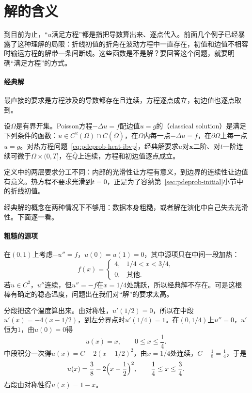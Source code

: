 \section{解的含义}
\label{sec:pdeprob-solutions}

到目前为止，“$u$满足方程”都是指把导数算出来、逐点代入。前面几个例子已经暴露了这种理解的局限：折线初值的折角在波动方程中一直存在，初值和边值不相容时输运方程的解带一条间断线。这些函数是不是解？要回答这个问题，就要明确“满足方程”的方式。

\paragraph{经典解}
最直接的要求是方程涉及的导数都存在且连续，方程逐点成立，初边值也逐点取到。

\begin{definition}[经典解]
\label{def:pdeprob-classical}
设$\Omega$是有界开集。Poisson方程$-\Delta u=f$配边值$u=g$的（classical solution）是满足下列条件的函数：$u\in C^{2}(\Omega)\cap C(\overline{\Omega})$，在$\Omega$内每一点$-\Delta u=f$，在$\partial\Omega$上每一点$u=g$。对热方程问题~\eqref{eq:pdeprob-heat-ibvp}，经典解要求$u$对$\bm{x}$二阶、对$t$一阶连续可微于$\Omega\times(0,T]$，在$\overline{Q}$上连续，方程和初边值逐点成立。
\end{definition}

定义中的两层要求分工不同：内部的光滑性让方程有意义，到边界的连续性让边值有意义。热方程不要求光滑到$t=0$，正是为了容纳第~\ref{sec:pdeprob-initial}小节中的折线初值。

经典解的概念在两种情况下不够用：数据本身粗糙，或者解在演化中自己失去光滑性。下面逐一看。

\paragraph{粗糙的源项}
在$(0,1)$上考虑$-u''=f$，$u(0)=u(1)=0$，其中源项只在中间一段加热：
\begin{equation}
  f(x)=\begin{cases}4,&1/4<x<3/4,\\0,&\text{其他}.\end{cases}
  \label{eq:pdeprob-step-source}
\end{equation}
若$u\in C^{2}$，$u''$连续，但$u''=-f$在$x=1/4$处跳跃，所以经典解不存在。可是这根棒有确定的稳态温度，问题出在我们对“解”的要求太高。

分段把这个温度算出来。由对称性，$u'(1/2)=0$，所以在中段$u'(x)=-4(x-1/2)$，到左分界点时$u'(1/4)=1$。在$(0,1/4)$上$u''=0$，$u'$恒为$1$，由$u(0)=0$得
\[
  u(x)=x,\qquad 0\leq x\leq\frac14.
\]
中段积分一次得$u(x)=C-2(x-1/2)^{2}$，由$x=1/4$处连续，$C-\frac18=\frac14$，于是
\[
  u(x)=\frac38-2\Bigl(x-\frac12\Bigr)^{2},\qquad \frac14\leq x\leq\frac34.
\]
右段由对称性得$u(x)=1-x$。

